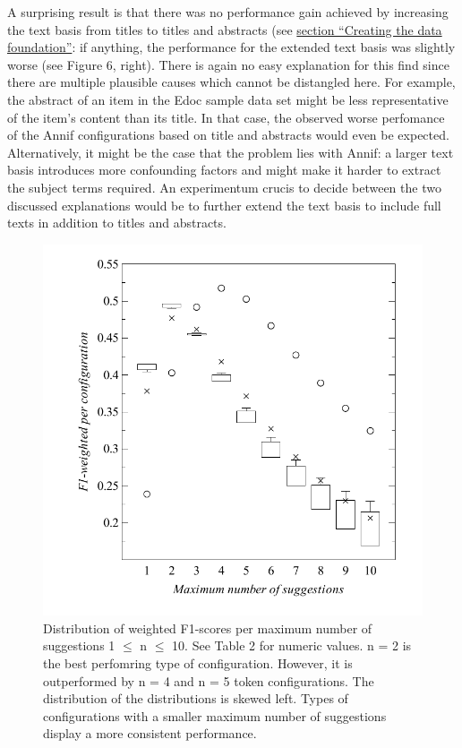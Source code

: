 A surprising result is that there was no performance gain achieved by
increasing the text basis from titles to titles and abstracts (see
\protect\hyperlink{creating-the-data-foundation}{section ``Creating the
data foundation''}: if anything, the performance for the extended text
basis was slightly worse (see Figure 6, right). There is again no easy
explanation for this find since there are multiple plausible causes
which cannot be distangled here. For example, the abstract of an item in
the Edoc sample data set might be less representative of the item's
content than its title. In that case, the observed worse perfomance of
the Annif configurations based on title and abstracts would even be
expected. Alternatively, it might be the case that the problem lies with
Annif: a larger text basis introduces more confounding factors and might
make it harder to extract the subject terms required. An experimentum
crucis to decide between the two discussed explanations would be to
further extend the text basis to include full texts in addition to
titles and abstracts.

\begin{figure}
\centering
\includegraphics{images/metrics_all_n.pdf}
\caption{Distribution of weighted F1-scores per maximum number of
suggestions 1 \(\leq\) n \(\leq\) 10. See Table 2 for numeric values. n
= 2 is the best perfomring type of configuration. However, it is
outperformed by n = 4 and n = 5 token configurations. The distribution
of the distributions is skewed left. Types of configurations with a
smaller maximum number of suggestions display a more consistent
performance.}
\end{figure}


